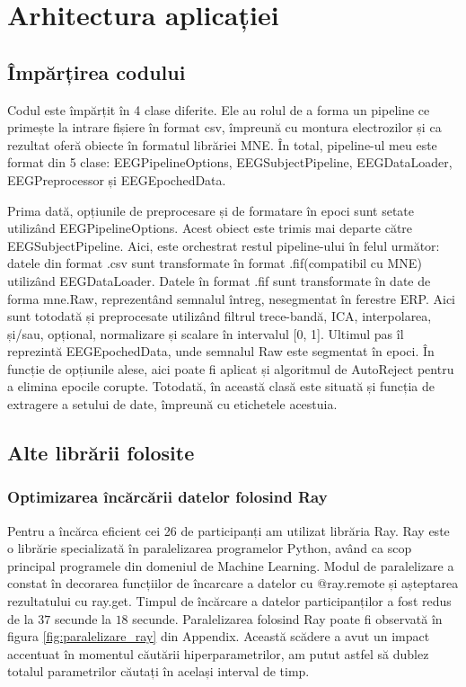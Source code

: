 \def\timpInainteDeRay{37}
\def\timpDupaRay{18}

\chapter{Arhitectura aplicației}
\section{Împărțirea codului}
Codul este împărțit în 4 clase diferite. Ele au rolul de a forma un pipeline ce primește la intrare fișiere în format csv, împreună cu montura electrozilor și ca rezultat oferă obiecte în formatul librăriei MNE\cite{MNE}.
În total, pipeline-ul meu este format din 5 clase: EEGPipelineOptions, EEGSubjectPipeline, EEGDataLoader, EEGPreprocessor și EEGEpochedData. 

Prima dată, opțiunile de preprocesare și de formatare în epoci sunt setate utilizând EEGPipelineOptions. Acest obiect este trimis mai departe către EEGSubjectPipeline. Aici, este orchestrat restul pipeline-ului în felul următor: datele din format .csv sunt transformate în format .fif(compatibil cu MNE\cite{MNE}) utilizând EEGDataLoader. Datele în format .fif sunt transformate în date de forma mne.Raw, reprezentând semnalul întreg, nesegmentat în ferestre ERP. Aici sunt totodată și preprocesate utilizând filtrul trece-bandă, ICA, interpolarea, și/sau, opțional, normalizare și scalare în intervalul [0, 1].  Ultimul pas îl reprezintă EEGEpochedData, unde semnalul Raw este segmentat în epoci. În funcție de opțiunile alese, aici poate fi aplicat și algoritmul de AutoReject\cite{AutoReject} pentru a elimina epocile corupte. Totodată, în această clasă este situată și funcția de extragere a setului de date, împreună cu etichetele acestuia.


\section{Alte librării folosite}
\subsection{Optimizarea încărcării datelor folosind Ray}
Pentru a încărca eficient cei 26 de participanți am utilizat librăria Ray\cite{Ray}. Ray este o librărie specializată în paralelizarea programelor Python, având ca scop principal programele din domeniul de Machine Learning. Modul de paralelizare a constat în decorarea funcțiilor de încarcare a datelor cu @ray.remote și așteptarea rezultatului cu ray.get. Timpul de încărcare a datelor participanților a fost redus de la $\timpInainteDeRay$ secunde la $\timpDupaRay$ secunde. Paralelizarea folosind Ray poate fi observată în figura \ref{fig:paralelizare_ray} din Appendix. Această scădere a avut un impact accentuat în momentul căutării hiperparametrilor, am putut astfel să dublez totalul parametrilor căutați în același interval de timp.

